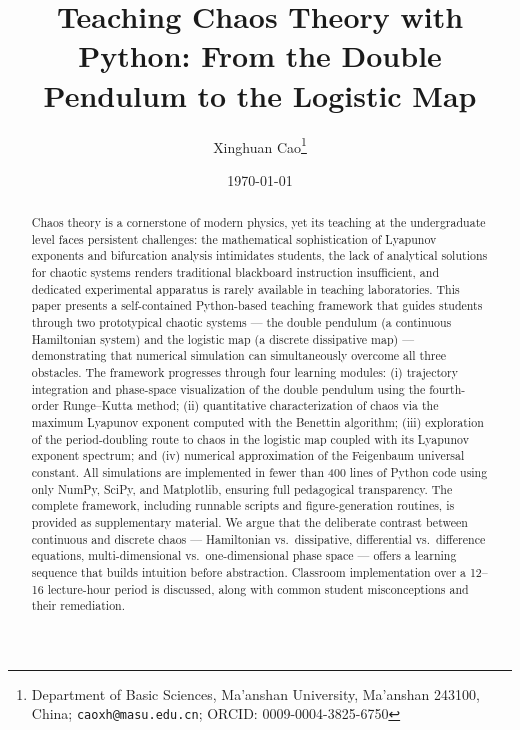 \documentclass[aps,twocolumn,showpacs]{revtex4-2}
\begin{document}
\title{Teaching Chaos Theory with Python: From the Double Pendulum to the Logistic Map}

\author{Xinghuan Cao\thanks{Department of Basic Sciences, Ma'anshan University, Ma'anshan 243100, China; \texttt{caoxh@masu.edu.cn}; ORCID: 0009-0004-3825-6750}}

\date{\today}

\begin{abstract}
Chaos theory is a cornerstone of modern physics, yet its teaching at the undergraduate level
faces persistent challenges: the mathematical sophistication of Lyapunov exponents and bifurcation
analysis intimidates students, the lack of analytical solutions for chaotic systems renders traditional
blackboard instruction insufficient, and dedicated experimental apparatus is rarely available in teaching
laboratories. This paper presents a self-contained Python-based teaching framework that guides students
through two prototypical chaotic systems --- the double pendulum (a continuous Hamiltonian system) and
the logistic map (a discrete dissipative map) --- demonstrating that numerical simulation can simultaneously
overcome all three obstacles. The framework progresses through four learning modules: (i) trajectory
integration and phase-space visualization of the double pendulum using the fourth-order Runge--Kutta
method; (ii) quantitative characterization of chaos via the maximum Lyapunov exponent computed with the
Benettin algorithm; (iii) exploration of the period-doubling route to chaos in the logistic map coupled
with its Lyapunov exponent spectrum; and (iv) numerical approximation of the Feigenbaum universal constant.
All simulations are implemented in fewer than 400 lines of Python code using only NumPy, SciPy, and
Matplotlib, ensuring full pedagogical transparency. The complete framework, including runnable scripts and
figure-generation routines, is provided as supplementary material. We argue that the deliberate contrast
between continuous and discrete chaos --- Hamiltonian vs.\ dissipative, differential vs.\ difference equations,
multi-dimensional vs.\ one-dimensional phase space --- offers a learning sequence that builds intuition before
abstraction. Classroom implementation over a 12--16 lecture-hour period is discussed, along with common
student misconceptions and their remediation.
\end{abstract}

\maketitle
\end{document}
